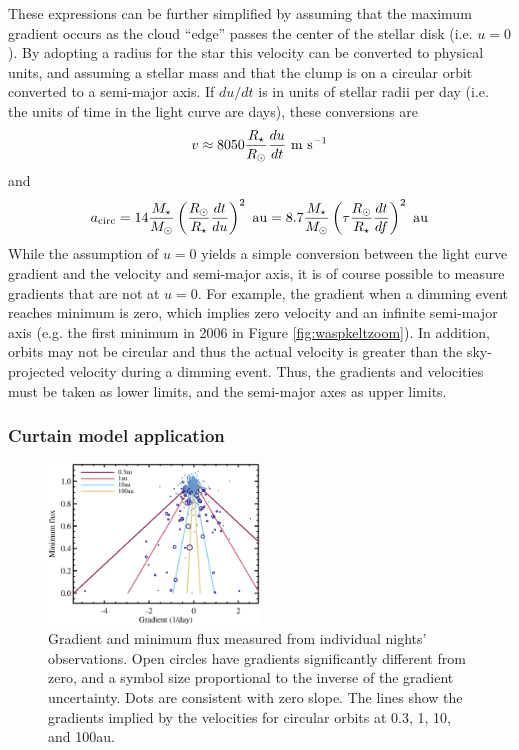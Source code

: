 \documentclass[useAMS,usenatbib,usegraphicx]{mn2e}
\begin{document}
These expressions can be further simplified by assuming that the maximum gradient occurs
as the cloud ``edge'' passes the center of the stellar disk (i.e. $u=0$). By adopting a
radius for the star this velocity can be converted to physical units, and assuming a
stellar mass and that the clump is on a circular orbit converted to a semi-major axis. If
$du/dt$ is in units of stellar radii per day (i.e. the units of time in the light curve
are days), these conversions are
\begin{equation}\label{eq:vcl}
  v \approx  8050 \frac{R_\star}{R_\odot} \frac{du}{dt} ~ {\rm m~s}^{-1}
\end{equation}
and
\begin{equation}\label{eq:acl}
  a_{\rm circ} %
  = 14 \frac{M_\star}{M_\odot} \left( \frac{R_\odot}{R_\star} \frac{dt}{du} \right)^2 ~
  {\rm au}
  = 8.7 \frac{M_\star}{M_\odot} \left( \tau \frac{R_\odot}{R_\star} \frac{dt}{df} \right)^2 ~
  {\rm au}
\end{equation}
While the assumption of $u=0$ yields a simple conversion between the light curve gradient
and the velocity and semi-major axis, it is of course possible to measure gradients that
are not at $u=0$. For example, the gradient when a dimming event reaches minimum is zero,
which implies zero velocity and an infinite semi-major axis (e.g. the first minimum in
2006 in Figure \ref{fig:waspkeltzoom}). In addition, orbits may not be circular and thus
the actual velocity is greater than the sky-projected velocity during a dimming
event. Thus, the gradients and velocities must be taken as lower limits, and the
semi-major axes as upper limits.

\subsubsection{Curtain model application}\label{sss:gradapp}

\begin{figure}
  \begin{center}
    \hspace{-0.5cm} \includegraphics[width=0.5\textwidth]{figs/gradients.eps}
    \caption{Gradient and minimum flux measured from individual nights'
      observations. Open circles have gradients significantly different from zero, and a
      symbol size proportional to the inverse of the gradient uncertainty. Dots are
      consistent with zero slope. The lines show the gradients implied by the velocities
      for circular orbits at 0.3, 1, 10, and 100au.}\label{fig:grad}
  \end{center}
\end{figure}
\end{document}
